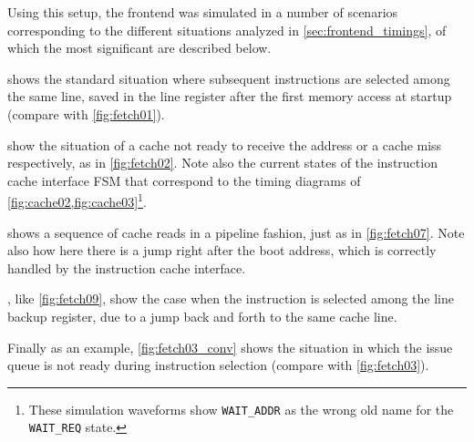 Using this setup, the frontend was simulated in a number of scenarios corresponding to the different situations analyzed in \cref{sec:frontend_timings}, of which the most significant are described below.

 shows the standard situation where subsequent instructions are selected among the same line, saved in the line register after the first memory access at startup (compare with \cref{fig:fetch01}).

 show the situation of a cache not ready to receive the address or a cache miss respectively, as in \cref{fig:fetch02}. Note also the current states of the instruction cache interface \acs{FSM} that correspond to the timing diagrams of \cref{fig:cache02,fig:cache03}\footnote{These simulation waveforms show \texttt{WAIT\_ADDR} as the wrong old name for the \texttt{WAIT\_REQ} state.}.

 shows a sequence of cache reads in a pipeline fashion, just as in \cref{fig:fetch07}. Note also how here there is a jump right after the boot address, which is correctly handled by the instruction cache interface.

, like \cref{fig:fetch09}, show the case when the instruction is selected among the line backup register, due to a jump back and forth to the same cache line.

Finally as an example, \cref{fig:fetch03_conv} shows the situation in which the issue queue is not ready during instruction selection (compare with \cref{fig:fetch03}).

